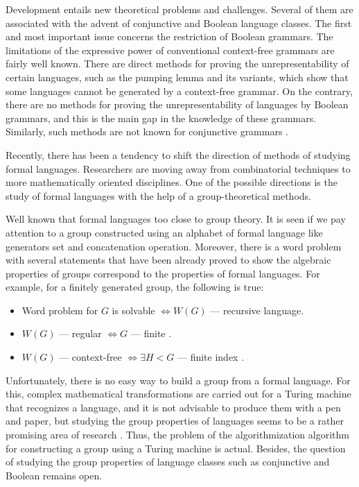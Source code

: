 \documentclass[conference]{IEEEtran}
\theoremstyle{definition}
\begin{document}
Development entails new theoretical problems and challenges. 
Several of them are associated with the advent of conjunctive and Boolean language classes. 
The first and most important issue concerns the restriction of Boolean grammars.
The limitations of the expressive power of conventional context-free grammars are fairly well known. There are direct methods for proving the unrepresentability of certain languages, 
such as the pumping lemma and its variants, which show that some languages 
cannot be generated by a context-free grammar. On the contrary, there are no methods 
for proving the unrepresentability of languages by Boolean grammars, and this 
is the main gap in the knowledge of these grammars. Similarly, 
such methods are not known for conjunctive grammars \cite{OKHOTIN201327}.

Recently, there has been a tendency to shift the direction of methods of studying formal languages.
Researchers are moving away from combinatorial techniques to more mathematically oriented disciplines.
One of the possible directions is the study of formal languages with the help of 
a group-theoretical methods.

Well known that formal languages too close to group theory. 
It is seen if we pay attention to a group constructed using an alphabet of 
formal language like generators set and concatenation operation. Moreover, 
there is a word problem with several statements that have been already 
proved to show the algebraic properties of groups correspond to the properties of formal languages. 
For example, for a finitely generated group, the following is true:
\begin{itemize}
    \item Word problem for $G$ is solvable $\iff W(G)$ --- recursive language. 
    \item $W(G)$ --- regular $\iff G$ --- finite \cite{Anisimov}.
    \item $W(G)$ --- context-free $\iff \exists H < G$ --- finite index \cite{Muller}.
\end{itemize}
Unfortunately, there is no easy way to build a group from a formal language. 
For this, complex mathematical transformations are carried out for a Turing machine 
that recognizes a language, and it is not advisable to produce them with a pen and paper, 
but studying the group properties of languages seems to be a rather promising 
area of research \cite{Sapir, SpaceFunc}.
Thus, the problem of the algorithmization algorithm 
for constructing a group using a Turing machine is actual.
Besides, the question of studying the group properties of language classes 
such as conjunctive and Boolean remains open. 
\end{document}
